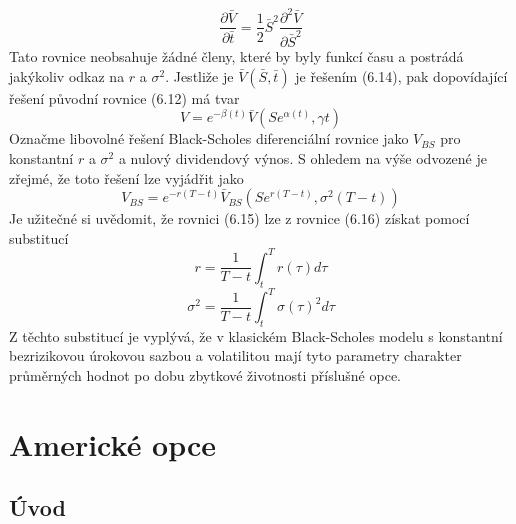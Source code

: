 \documentclass[a4paper]{book}
\begin{document}
\begin{equation}
\frac{\partial \bar{V}}{\partial \bar{t}} = \frac{1}{2} \bar{S}^2 \frac{\partial^2 \bar{V}}{\partial \bar{S}^2}
\end{equation}
Tato rovnice neobsahuje žádné členy, které by byly funkcí času a postrádá jakýkoliv odkaz na $r$ a $\sigma^2$. Jestliže je $\bar{V}(\bar{S}, \bar{t})$ je řešením (6.14), pak dopovídající řešení původní rovnice (6.12) má tvar
\begin{equation}
V = e^{-\beta(t)} \bar{V}(Se^{\alpha(t)}, \gamma{t})
\end{equation}
Označme libovolné řešení Black-Scholes diferenciální rovnice jako $V_{BS}$ pro konstantní $r$ a $\sigma^2$ a nulový dividendový výnos. S ohledem na výše odvozené je zřejmé, že toto řešení lze vyjádřit jako
\begin{equation}
V_{BS} = e^{-r(T - t)}\bar{V}_{BS}(Se^{r(T - t)},\sigma^2(T-t))
\end{equation}
Je užitečné si uvědomit, že rovnici (6.15) lze z rovnice (6.16) získat pomocí substitucí
\begin{equation*}
r = \frac{1}{T - t} \int^T_t r(\tau) d \tau
\end{equation*}
\begin{equation*}
\sigma^2 = \frac{1}{T - t} \int^T_t \sigma(\tau)^2 d \tau
\end{equation*}
Z těchto substitucí je vyplývá, že v klasickém Black-Scholes modelu s konstantní bezrizikovou úrokovou sazbou a volatilitou mají tyto parametry charakter průměrných hodnot po dobu zbytkové životnosti příslušné opce.

\chapter{Americké opce}

\section{Úvod}
\end{document}
